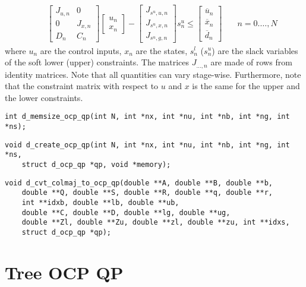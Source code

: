 \documentclass[a4paper]{report}
\begin{document}
\begin{align*}
& \quad \begin{bmatrix} J_{u,n} & 0 \\ 0 & J_{x,n} \\ D_n & C_n \end{bmatrix} \begin{bmatrix} u_n \\ x_n \end{bmatrix} - \begin{bmatrix} J_{s^u,u,n} \\ J_{s^u,x,n} \\ J_{s^u,g,n} \end{bmatrix} s^u_n \leq \begin{bmatrix} \overline u_n \\ \overline x_n \\ \overline d_n \end{bmatrix} & \quad n=0.\dots,N
\end{align*}
where $u_n$ are the control inputs, $x_n$ are the states, $s^l_n$ ($s^u_n$) are the slack variables of the soft lower (upper) constraints.
The matrices $J_{\dots,n}$ are made of rows from identity matrices.
Note that all quantities can vary stage-wise.
Furthermore, note that the constraint matrix with respect to $u$ and $x$ is the same for the upper and the lower constraints.

\begin{verbatim}
int d_memsize_ocp_qp(int N, int *nx, int *nu, int *nb, int *ng, int *ns);
\end{verbatim}

\begin{verbatim}
void d_create_ocp_qp(int N, int *nx, int *nu, int *nb, int *ng, int *ns, 
    struct d_ocp_qp *qp, void *memory);
\end{verbatim}

\begin{verbatim}
void d_cvt_colmaj_to_ocp_qp(double **A, double **B, double **b, 
    double **Q, double **S, double **R, double **q, double **r, 
    int **idxb, double **lb, double **ub, 
    double **C, double **D, double **lg, double **ug, 
    double **Zl, double **Zu, double **zl, double **zu, int **idxs, 
    struct d_ocp_qp *qp);
\end{verbatim}



\chapter{Tree OCP QP}
\end{document}
